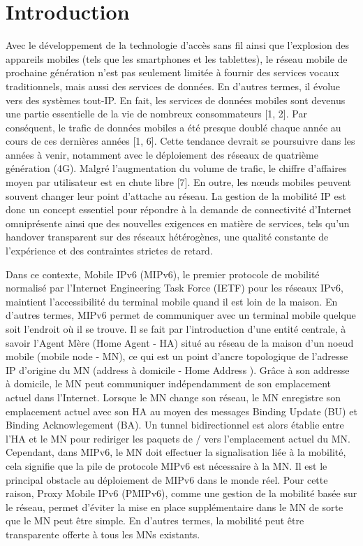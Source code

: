 \section{Introduction}
Avec le développement de la technologie d'accès sans fil ainsi que l'explosion des appareils mobiles (tels que les smartphones et les tablettes), le réseau mobile de prochaine génération n'est pas seulement limitée à fournir des services vocaux traditionnels, mais aussi des services de données. En d'autres termes, il évolue vers des systèmes tout-IP. En fait, les services de données mobiles sont devenus une partie essentielle de la vie de nombreux consommateurs [1, 2]. Par conséquent, le trafic de données mobiles a été presque doublé chaque année au cours de ces dernières années [1, 6]. Cette tendance devrait se poursuivre dans les années à venir, notamment avec le déploiement des réseaux de quatrième génération (4G). Malgré l'augmentation du volume de trafic, le chiffre d'affaires moyen par utilisateur est en chute libre [7]. En outre, les nœuds mobiles peuvent souvent changer leur point d'attache au réseau. La gestion de la mobilité IP est donc un concept essentiel pour répondre à la demande de connectivité d'Internet omniprésente ainsi que des nouvelles exigences en matière de services, tels qu'un handover transparent sur des réseaux hétérogènes, une qualité constante de l'expérience et des contraintes strictes de retard.

Dans ce contexte, Mobile IPv6 (MIPv6), le premier protocole de mobilité normalisé par l'Internet Engineering Task Force (IETF) pour les réseaux IPv6, maintient l'accessibilité du terminal mobile quand il est loin de la maison. En d'autres termes, MIPv6 permet de communiquer avec un terminal mobile quelque soit l'endroit où il se trouve. Il se fait par l'introduction d'une entité centrale, à savoir l'Agent Mère (Home Agent - HA) situé au réseau de la maison d'un noeud mobile (mobile node - MN), ce qui est un point d'ancre topologique de l'adresse IP d'origine du MN (address à domicile - Home Address ). Grâce à son addresse à  domicile, le MN peut communiquer indépendamment de son emplacement actuel dans l'Internet. Lorsque le MN change son réseau, le MN enregistre son emplacement actuel avec son HA au moyen des messages Binding Update (BU) et Binding Acknowlegement (BA). Un tunnel bidirectionnel est alors établie entre l'HA et le MN pour rediriger les paquets de / vers l'emplacement actuel du MN. Cependant, dans MIPv6, le MN doit effectuer la signalisation liée à la mobilité, cela signifie que la pile de protocole MIPv6 est nécessaire à la MN. Il est le principal obstacle au déploiement de MIPv6 dans le monde réel. Pour cette raison, Proxy Mobile IPv6 (PMIPv6), comme une gestion de la mobilité basée sur le réseau, permet d'éviter la mise en place supplémentaire dans le MN de sorte que le MN peut être simple. En d'autres termes, la mobilité peut être transparente offerte à tous les MNs existants.

